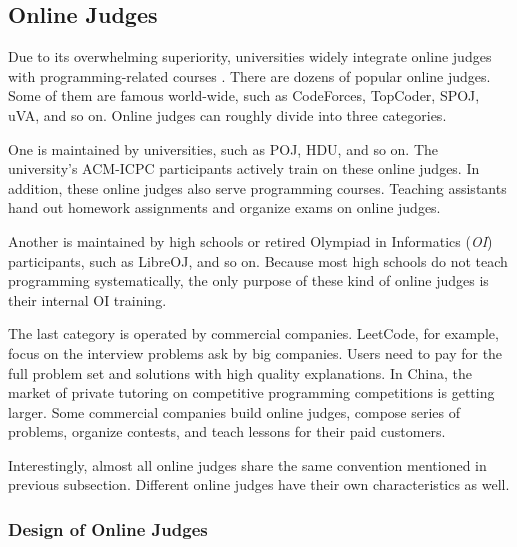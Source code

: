     \subsection{Online Judges}

        Due to its overwhelming superiority,
        universities widely integrate online judges with programming-related courses \cite{Li2005}.
        There are dozens of popular online judges.
        Some of them are famous world-wide, such as CodeForces, TopCoder, SPOJ, uVA, and so on. 
        Online judges can roughly divide into three categories.

        One is maintained by universities, such as POJ, HDU, and so on. 
        The university's ACM-ICPC participants actively train on these online judges.
        In addition, these online judges also serve programming courses.
        Teaching assistants hand out homework assignments and organize exams on online judges.

        Another is maintained by high schools
        or retired Olympiad in Informatics (\emph{OI}) participants,
        such as LibreOJ, and so on. 
        Because most high schools do not teach programming systematically,
        the only purpose of these kind of online judges is their internal OI training.

        The last category is operated by commercial companies. 
        LeetCode, for example, focus on the interview problems ask by big companies.
        Users need to pay for the full problem set and solutions with high quality explanations.
        In China, the market of private tutoring on competitive programming competitions is getting larger.
        Some commercial companies build online judges, compose series of problems, organize contests,
        and teach lessons for their paid customers.

        Interestingly, almost all online judges share the same convention mentioned in previous subsection.
        Different online judges have their own characteristics as well.

        \subsubsection{Design of Online Judges}


